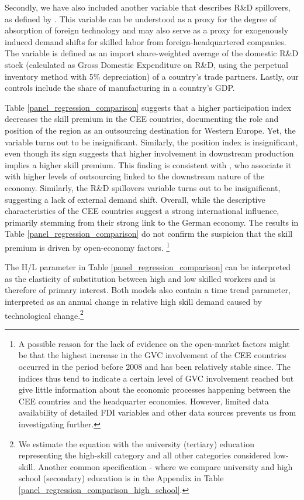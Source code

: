 \documentclass[11pt]{article}
\begin{document}
Secondly, we have also included another variable that describes R\&D spillovers, as defined by \cite{coe1995international}. This variable can be understood as a proxy for the degree of absorption of foreign technology and may also serve as a proxy for exogenously induced demand shifts for skilled labor from foreign-headquartered companies. The variable is defined as an import share-weighted average of the domestic R\&D stock (calculated as Gross Domestic Expenditure on R\&D, using the perpetual inventory method with 5\% depreciation) of a country's trade partners. Lastly, our controls include the share of manufacturing in a country's GDP.

Table \ref{panel_regression_comparison} suggests that a higher participation index decreases the skill premium in the CEE countries, documenting the role and position of the region as an outsourcing destination for Western Europe. Yet, the variable turns out to be insignificant. Similarly, the position index is insignificant, even though its sign suggests that higher involvement in downstream production implies a higher skill premium. This finding is consistent with \citet{coveri2024global}, who associate it with higher levels of outsourcing linked to the downstream nature of the economy. Similarly, the R\&D spillovers variable turns out to be insignificant, suggesting a lack of external demand shift. Overall, while the descriptive characteristics of the CEE countries suggest a strong international influence, primarily stemming from their strong link to the German economy. The results in Table \ref{panel_regression_comparison}  do not confirm the suspicion that the skill premium is driven by open-economy factors. \footnote{A possible reason for the lack of evidence on the open-market factors might be that the highest increase in the GVC involvement of the CEE countries occurred in the period before 2008 and has been relatively stable since. The indices thus tend to indicate a certain level of GVC involvement reached but give little information about the economic processes happening between the CEE countries and the headquarter economies. However, limited data availability of detailed FDI variables and other data sources prevents us from investigating further.}

The H/L parameter in Table \ref{panel_regression_comparison} can be interpreted as the elasticity of substitution between high and low skilled workers and is therefore of primary interest. Both models also contain a time trend parameter, interpreted as an annual change in relative high skill demand caused by technological change.\footnote{We estimate the equation with the university (tertiary) education representing the high-skill category and all other categories considered low-skill. Another common specification - where we compare university and high school (secondary) education is in the Appendix in Table \ref{panel_regression_comparison_high_school}.}
\end{document}
